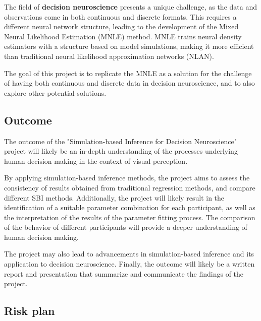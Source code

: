
The field of \textbf{decision neuroscience} presents a unique challenge, as the data and observations come in both continuous and discrete formats. This requires a different neural network structure, leading to the development of the Mixed Neural Likelihood Estimation (MNLE) method. MNLE trains neural density estimators with a structure based on model simulations, making it more efficient than traditional neural likelihood approximation networks (NLAN).

The goal of this project is to replicate the MNLE as a solution for the challenge of having both continuous and discrete data in decision neuroscience, and to also explore other potential solutions.

\subsection{Outcome}

The outcome of the "Simulation-based Inference for Decision Neuroscience" project will likely be an in-depth understanding of the processes underlying human decision making in the context of visual perception. 

By applying simulation-based inference methods, the project aims to assess the consistency of results obtained from traditional regression methods, and compare different SBI methods. Additionally, the project will likely result in the identification of a suitable parameter combination for each participant, as well as the interpretation of the results of the parameter fitting process. The comparison of the behavior of different participants will provide a deeper understanding of human decision making. 

The project may also lead to advancements in simulation-based inference and its application to decision neuroscience. Finally, the outcome will likely be a written report and presentation that summarize and communicate the findings of the project.

\subsection{Risk plan}

